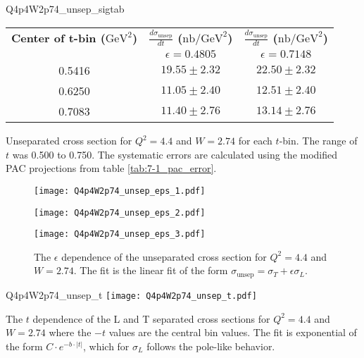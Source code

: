 \begin{Mtable}{Q4p4W2p74_unsep_sigtab}
  \centering
  \begin{tabular}{|c|c|c|}
    \hline
    \textbf{Center of t-bin ($\mathrm{GeV}^2$)} & \textbf{$\frac{d\sigma_{\mathrm{unsep}}}{dt}$ ($\mathrm{nb/GeV}^2$)} & \textbf{$\frac{d\sigma_{\mathrm{unsep}}}{dt}$ ($\mathrm{nb/GeV}^2$)} \\
    & $\epsilon=0.4805$ & $\epsilon=0.7148$ \\
    \hline
    0.5416 & $19.55\pm2.32$ & $22.50\pm2.32$\\
    0.6250 & $11.05\pm2.40$ & $12.51\pm2.40$\\
    0.7083 & $11.40\pm2.76$ & $13.14\pm2.76$\\
    \hline
  \end{tabular}
  \caption{Unseparated cross section for $Q^2=4.4$ and $W=2.74$ for each $t$-bin. The range of $t$ was 0.500 to 0.750. The systematic errors are calculated using the modified PAC projections from table \ref{tab:7-1_pac_error}.}
  \label{tab:Q4p4W2p74_unsep_sigtab}
\end{Mtable}

\begin{figure}
  \centering
  \begin{minipage}[b]{0.48\linewidth}
    \texttt{[image: Q4p4W2p74\_unsep\_eps\_1.pdf]}
  \end{minipage}
  \hfill
  \begin{minipage}[b]{0.48\linewidth}
    \texttt{[image: Q4p4W2p74\_unsep\_eps\_2.pdf]}
  \end{minipage}
  \begin{minipage}[b]{0.48\linewidth}
    \texttt{[image: Q4p4W2p74\_unsep\_eps\_3.pdf]}
  \end{minipage}
  \caption{The $\epsilon$ dependence of the unseparated cross section for $Q^2=4.4$ and $W=2.74$. The fit is the linear fit of the form $\sigma_{\mathrm{unsep}}=\sigma_T+\epsilon\sigma_L$.}
  \label{fig:Q4p4W2p74_unsep_eps}
\end{figure}

\begin{Mfigure}{Q4p4W2p74_unsep_t}
  \centering
  \texttt{[image: Q4p4W2p74\_unsep\_t.pdf]}
  \caption{The $t$ dependence of the L and T separated cross sections for $Q^2=4.4$ and $W=2.74$ where the $-t$ values are the central bin values. The fit is exponential of the form $C\cdot e^{-b\cdot|t|}$, which for $\sigma_L$ follows the pole-like behavior.}
  \label{fig:Q4p4W2p74_unsep_t}
\end{Mfigure}

